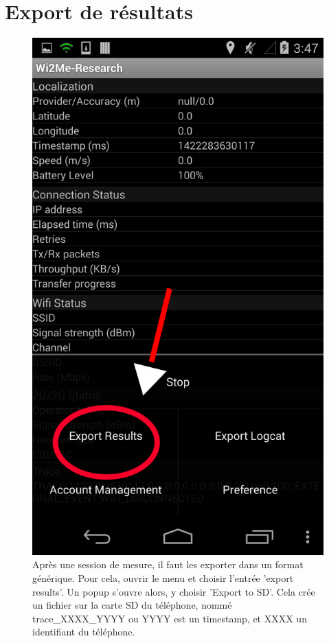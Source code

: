 \documentclass[11pt]{article}
\newcommand\mtext[2]{#1}
\newcommand\mtext[2]{#2}
\begin{document}
\newpage
\section{\mtext{Export de résultats}{exporting results}}\label{sec:exporting}


\begin{figure}
  \centering
  \caption{
\mtext{Après une session de mesure, il faut les exporter dans un format
générique. Pour cela, ouvrir le menu et choisir l'entrée 'export results'. Un
popup s'ouvre alors, y choisir 'Export to SD'. Cela crée un fichier sur la carte
SD du téléphone, nommé trace\_XXXX\_YYYY ou YYYY est un timestamp, et XXXX un
identifiant du téléphone.}{After a data gathering phase, you will need to export your results for further processing. To do so, open the menu again, and press the 'export results' button. A pop up will appear asking the type of export you wish to use. Select the "Export to" SD option.
Once this is done, you can find your measurements at the phone's sdcard root,
under the name TraceLog\_XXXX\_YYYY where XXXX is an identifier unique to the
phone, and YYYY, a timestamp of the moment you performed the export.
}
}
  \includegraphics[height=0.4\textheight]{export.png}

\end{figure}
\end{document}
